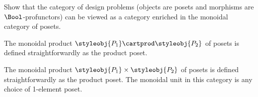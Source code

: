 \begin{gradedexercise}
	\label{ex:DPIsEnrichedInPos}
	Show that the category of design problems (objects are posets and morphisms are $\Bool$-profunctors) can be viewed as a category enriched in the monoidal category of posets.



	The monoidal product $\styleobj{P_1} \cartprod \styleobj{P_2}$ of posets is defined straightforwardly as the product poset.



	The monoidal product $\styleobj{P_1} \times \styleobj{P_2}$ of posets is defined straightforwardly as the product poset.
	The monoidal unit in this category is any choice of 1-element poset.
\end{gradedexercise}

